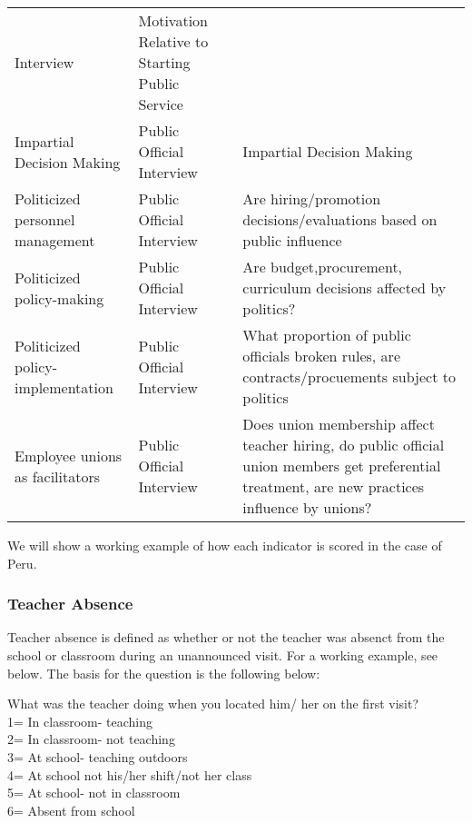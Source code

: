 \documentclass[]{article}
\begin{document}
\begin{longtable}[]{@{}lll@{}}
Interview & Motivation Relative to Starting Public
Service\tabularnewline
Impartial Decision Making & Public Official Interview & Impartial
Decision Making\tabularnewline
Politicized personnel management & Public Official Interview & Are
hiring/promotion decisions/evaluations based on public
influence\tabularnewline
Politicized policy-making & Public Official Interview & Are
budget,procurement, curriculum decisions affected by
politics?\tabularnewline
Politicized policy-implementation & Public Official Interview & What
proportion of public officials broken rules, are contracts/procuements
subject to politics\tabularnewline
Employee unions as facilitators & Public Official Interview & Does union
membership affect teacher hiring, do public official union members get
preferential treatment, are new practices influence by
unions?\tabularnewline
\bottomrule
\end{longtable}

We will show a working example of how each indicator is scored in the
case of Peru.

\hypertarget{teacher-absence}{%
\subsubsection{Teacher Absence}\label{teacher-absence}}

Teacher absence is defined as whether or not the teacher was absenct
from the school or classroom during an unannounced visit. For a working
example, see below. The basis for the question is the following below:

What was the teacher doing when you located him/ her on the first
visit?\\
1= In classroom- teaching\\
2= In classroom- not teaching\\
3= At school- teaching outdoors\\
4= At school not his/her shift/not her class\\
5= At school- not in classroom\\
6= Absent from school
\end{document}
